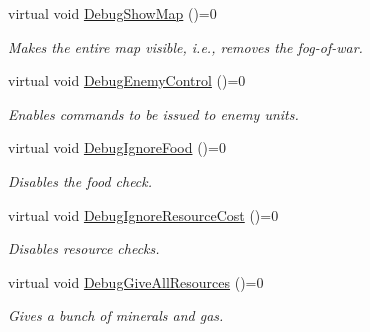 \begin{DoxyCompactItemize}
\item 
\mbox{\label{classsc2_1_1_debug_interface_ab25a7057a3e3ee4ce4895ffe6b9f665a}} 
virtual void \hyperlink{classsc2_1_1_debug_interface_ab25a7057a3e3ee4ce4895ffe6b9f665a}{Debug\+Show\+Map} ()=0
\begin{DoxyCompactList}\small\item\em Makes the entire map visible, i.\+e., removes the fog-\/of-\/war. \end{DoxyCompactList}\item 
\mbox{\label{classsc2_1_1_debug_interface_af232f60819f07b1c6da87ed43da460fa}} 
virtual void \hyperlink{classsc2_1_1_debug_interface_af232f60819f07b1c6da87ed43da460fa}{Debug\+Enemy\+Control} ()=0
\begin{DoxyCompactList}\small\item\em Enables commands to be issued to enemy units. \end{DoxyCompactList}\item 
\mbox{\label{classsc2_1_1_debug_interface_a21a7588fdc3bceaa1ed7613978826bc6}} 
virtual void \hyperlink{classsc2_1_1_debug_interface_a21a7588fdc3bceaa1ed7613978826bc6}{Debug\+Ignore\+Food} ()=0
\begin{DoxyCompactList}\small\item\em Disables the food check. \end{DoxyCompactList}\item 
\mbox{\label{classsc2_1_1_debug_interface_a72927b9269c87edb59c9365cfc973000}} 
virtual void \hyperlink{classsc2_1_1_debug_interface_a72927b9269c87edb59c9365cfc973000}{Debug\+Ignore\+Resource\+Cost} ()=0
\begin{DoxyCompactList}\small\item\em Disables resource checks. \end{DoxyCompactList}\item 
\mbox{\label{classsc2_1_1_debug_interface_a2043a4888715616d85de8509661b4694}} 
virtual void \hyperlink{classsc2_1_1_debug_interface_a2043a4888715616d85de8509661b4694}{Debug\+Give\+All\+Resources} ()=0
\begin{DoxyCompactList}\small\item\em Gives a bunch of minerals and gas. \end{DoxyCompactList}\item 

\end{DoxyCompactItemize}
